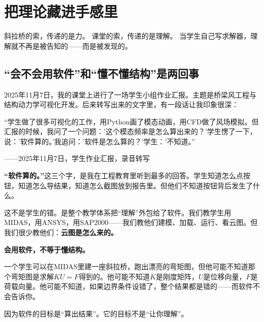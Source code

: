
\chapter{把理论藏进手感里}

\vspace{0.5cm}

\begin{center}
{\small\color{muted} 斜拉桥的索，传递的是力。}
{\small\color{muted} 课堂的索，传递的是理解。}
{\small\color{muted} 当学生自己写求解器，理解就不再是被告知的——而是被发现的。}
\end{center}

\vspace{1cm}

\section{``会不会用软件''和``懂不懂结构''是两回事}

2025年11月7日，我的课堂上进行了一场学生小组作业汇报。主题是桥梁风工程与结构动力学可视化开发。后来转写出来的文字里，有一段话让我印象很深：

\begin{shiyu-inline}
``学生做了很多可视化的工作，用Python画了模态动画，用CFD做了风场模拟。但汇报的时候，我问了一个问题：'这个模态频率是怎么算出来的？'学生愣了一下，说：'软件算的。'我追问：'软件是怎么算的？'学生：'不知道。''

\hfill ——2025年11月7日，学生作业汇报，录音转写
\end{shiyu-inline}

\textbf{``软件算的。''}这三个字，是我在工程教育里听到最多的回答。学生知道怎么点按钮，知道怎么导结果，知道怎么截图放到报告里。但他们不知道按钮背后发生了什么。

这不是学生的错。是整个教学体系把``理解''外包给了软件。我们教学生用MIDAS，用ANSYS，用SAP2000——我们教他们建模、加载、运行、看云图。但我们很少教他们：\textbf{云图是怎么来的。}

\begin{insight}
\label{insight:chap8}

\textbf{会用软件，不等于懂结构。}

一个学生可以在MIDAS里建一座斜拉桥，跑出漂亮的弯矩图，但他可能不知道那个弯矩图是求解$KU=F$得到的。他可能不知道$K$是刚度矩阵，$U$是位移向量，$F$是荷载向量。他可能不知道，如果边界条件设错了，整个结果都是错的——而软件不会告诉你。

因为软件的目标是``算出结果''。它的目标不是``让你理解''。
\end{insight}

